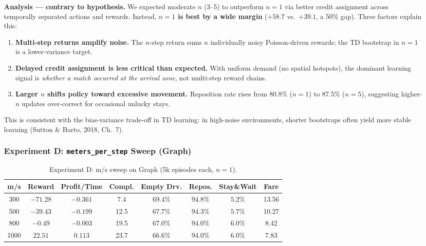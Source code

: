 \textbf{Analysis — contrary to hypothesis.} We expected moderate $n$ (3--5) to outperform $n{=}1$ via better credit assignment across temporally separated actions and rewards. Instead, \textbf{$n{=}1$ is best by a wide margin} ($+58.7$ vs.\ $+39.1$, a 50\% gap). Three factors explain this:

\begin{enumerate}[leftmargin=*,nosep]
    \item \textbf{Multi-step returns amplify noise.} The $n$-step return sums $n$ individually noisy Poisson-driven rewards; the TD bootstrap in $n{=}1$ is a lower-variance target.
    \item \textbf{Delayed credit assignment is less critical than expected.} With uniform demand (no spatial hotspots), the dominant learning signal is \emph{whether a match occurred at the arrival zone}, not multi-step reward chains.
    \item \textbf{Larger $n$ shifts policy toward excessive movement.} Reposition rate rises from 80.8\% ($n{=}1$) to 87.5\% ($n{=}5$), suggesting higher-$n$ updates over-correct for occasional unlucky stays.
\end{enumerate}

This is consistent with the bias-variance trade-off in TD learning: in high-noise environments, shorter bootstraps often yield more stable learning (Sutton \& Barto, 2018, Ch.~7).

\subsubsection{Experiment D: \texttt{meters\_per\_step} Sweep (Graph)}

\begin{table}[ht]
\centering
\caption{Experiment D: m/s sweep on Graph (5k episodes each, $n{=}1$).}
\label{tab:res-d}
\begin{tabular}{cccccccc}
\toprule
\textbf{m/s} & \textbf{Reward} & \textbf{Profit/Time} & \textbf{Compl.} & \textbf{Empty Drv.} & \textbf{Repos.} & \textbf{Stay\&Wait} & \textbf{Fare} \\
\midrule
300  & $-71.28$ & $-0.361$ & 7.4  & $69.4\%$ & $94.8\%$ & $5.2\%$ & 13.56 \\
500  & $-39.43$ & $-0.199$ & 12.5 & $67.7\%$ & $94.3\%$ & $5.7\%$ & 10.27 \\
800  & $-0.49$  & $-0.003$ & 19.5 & $67.0\%$ & $94.0\%$ & $6.0\%$ & 8.42  \\
1000 & $\mathbf{22.51}$  & $\mathbf{0.113}$  & $\mathbf{23.7}$ & $66.6\%$ & $94.0\%$ & $6.0\%$ & 7.83  \\
\bottomrule
\end{tabular}
\end{table}

